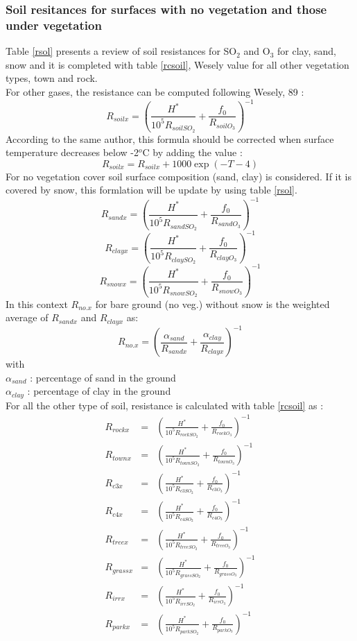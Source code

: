 \subsubsection{Soil resitances for surfaces with no vegetation and those
under vegetation}
Table \ref{rsol} presents a review of soil resistances for SO$_2$ and O$_3$
for clay, sand, snow and it is completed
with table \ref{rcsoil}, Wesely value for all other vegetation types, 
town and rock.\\
For other gases, the resistance can be computed following Wesely, 89 :
\[ R_{soilx} = (\frac{H^*}{10^5 R_{soilSO_2}}+ \frac{f_0}{R_{soilO_3}})^{-1} \]
According to the same author, this formula should be corrected when surface
temperature decreases below -2$^o$C by adding the value :
\[R_{soilx} =  R_{soilx} + 1000 \exp (-T-4) \]
For no vegetation cover soil surface composition
(sand, clay) is considered. If it is 
covered by snow, this formlation will be update by using table \ref{rsol}. 
\[ R_{sandx} = (\frac{H^*}{10^5 R_{sandSO_2}}+ \frac{f_0}{R_{sandO_3}})^{-1} \]
\[ R_{clayx} = (\frac{H^*}{10^5 R_{claySO_2}}+ \frac{f_0}{R_{clayO_3}})^{-1} \]
\[ R_{snowx} = (\frac{H^*}{10^5 R_{snowSO_2}}+ \frac{f_0}{R_{snowO_3}})^{-1} \]
In this context $R_{no.x}$ for bare ground (no veg.) without snow is
the weighted average of $R_{sandx}$ and $R_{clayx}$ as: 
$$ R_{no.x} = ( \frac{\alpha_{sand}}{R_{sandx}} +
                \frac{\alpha_{clay}}{R_{clayx}} )^{-1} $$
with\\
$\alpha_{sand}$ : percentage of sand in the ground \\
$\alpha_{clay}$ : percentage of clay in the ground \\
For all the other type of soil, resistance is calculated with table
\ref{rcsoil} as :
\begin{eqnarray*} 
R_{rockx} & = & (\frac{H^*}{10^5 R_{rockSO_2}}+
        \frac{f_0}{R_{rockO_3}})^{-1}  \\
R_{townx} & = & (\frac{H^*}{10^5 R_{townSO_2}}+
        \frac{f_0}{R_{townO_3}})^{-1} \\
R_{c3x} & = & (\frac{H^*}{10^5 R_{c3SO_2}}+ \frac{f_0}{R_{c3O_3}})^{-1} \\
R_{c4x} & = & (\frac{H^*}{10^5 R_{c4SO_2}}+ \frac{f_0}{R_{c4O_3}})^{-1} \\
R_{treex} & = & (\frac{H^*}{10^5 R_{treeSO_2}}+
        \frac{f_0}{R_{treeO_3}})^{-1} \\
R_{grassx} & = & (\frac{H^*}{10^5 R_{grassSO_2}}+
        \frac{f_0}{R_{grassO_3}})^{-1} \\
R_{irrx} & = & (\frac{H^*}{10^5 R_{irrSO_2}}+
        \frac{f_0}{R_{irrO_3}})^{-1} \\
R_{parkx} & = & (\frac{H^*}{10^5 R_{parkSO_2}}+
        \frac{f_0}{R_{parkO_3}})^{-1} \\
\end{eqnarray*}

